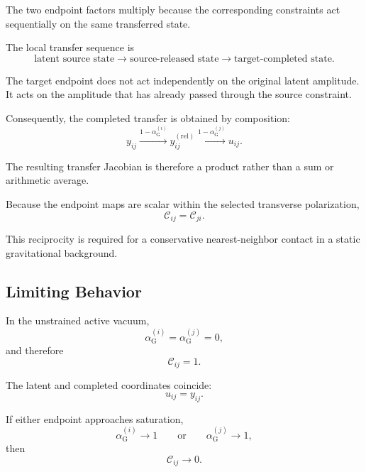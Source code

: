 The two endpoint factors multiply because the corresponding constraints act sequentially on the same transferred state.

The local transfer sequence is
\begin{equation}
    \text{latent source state} \longrightarrow \text{source-released state} \longrightarrow \text{target-completed state}.
\end{equation}

The target endpoint does not act independently on the original latent amplitude. It acts on the amplitude that has already passed through the source constraint.

Consequently, the completed transfer is obtained by composition:
\begin{equation}
    y_{ij} \overset{ 1-\alpha_{\mathrm{G}}^{(i)} }{ \longrightarrow } y_{ij}^{(\mathrm{rel})} \overset{ 1-\alpha_{\mathrm{G}}^{(j)} }{ \longrightarrow } u_{ij}.
\end{equation}

The resulting transfer Jacobian is therefore a product rather than a sum or arithmetic average.

Because the endpoint maps are scalar within the selected transverse polarization,
\begin{equation}
    \mathcal{C}_{ij} = \mathcal{C}_{ji}.
\end{equation}

This reciprocity is required for a conservative nearest-neighbor contact in a static gravitational background.

\subsection{Limiting Behavior}

In the unstrained active vacuum,
\begin{equation}
    \alpha_{\mathrm{G}}^{(i)} = \alpha_{\mathrm{G}}^{(j)} = 0,
\end{equation}
and therefore
\begin{equation}
    \mathcal{C}_{ij}=1.
\end{equation}

The latent and completed coordinates coincide:
\begin{equation}
    u_{ij} = y_{ij}.
\end{equation}

If either endpoint approaches saturation,
\begin{equation}
    \alpha_{\mathrm{G}}^{(i)} \rightarrow 1 \qquad\text{or}\qquad \alpha_{\mathrm{G}}^{(j)} \rightarrow 1,
\end{equation}
then
\begin{equation}
    \mathcal{C}_{ij} \rightarrow 0.
\end{equation}

